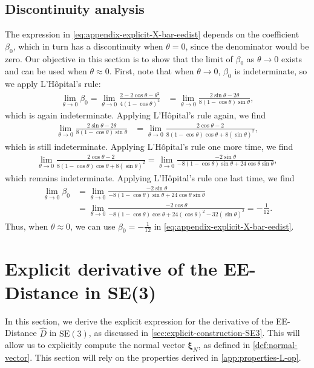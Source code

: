 \subsection{Discontinuity analysis}\label{app:discontinuity-beta-EEdist}
The expression in \eqref{eq:appendix-explicit-X-bar-eedist} depends on the coefficient $\beta_0$, which in turn has a discontinuity when $\theta=0$, since the denominator would be zero. Our objective in this section is to show that the limit of $\beta_0$ as $\theta\to 0$ exists and can be used when $\theta\approx0$. First, note that when $\theta\to 0$, $\beta_0$ is indeterminate, so we apply L'Hôpital's rule:
\begin{align}
    \lim_{\theta\to0}\beta_0=\lim_{\theta\to0} \frac{2-2\cos\theta-\theta^2}{4(1 - \cos\theta)^2}
    &= \lim_{\theta\to0} \frac{2\sin\theta-2\theta}{8(1 - \cos\theta)\sin\theta},
\end{align}
which is again indeterminate. Applying L'Hôpital's rule again, we find
\begin{align}
    \lim_{\theta\to0} \frac{2\sin\theta-2\theta}{8(1 - \cos\theta)\sin\theta}
    &= \lim_{\theta\to0} \frac{2\cos\theta-2}{8(1 - \cos\theta)\cos\theta +8(\sin\theta)^2},
\end{align}
which is still indeterminate. Applying L'Hôpital's rule one more time, we find
\begin{align}
    \lim_{\theta\to0} \frac{2\cos\theta-2}{8(1 - \cos\theta)\cos\theta +8(\sin\theta)^2} =
    \lim_{\theta\to0}\frac{-2\sin\theta}{-8(1 - \cos\theta)\sin\theta +24\cos\theta\sin\theta},
\end{align}
which remains indeterminate. Applying L'Hôpital's rule one last time, we find
\begin{align}
    \lim_{\theta\to0}\beta_0&=\lim_{\theta\to0}\frac{-2\sin\theta}{-8(1 - \cos\theta)\sin\theta +24\cos\theta\sin\theta} \\
    &=
    \lim_{\theta\to0}\frac{-2\cos\theta}{-8(1 - \cos\theta)\cos\theta +24(\cos\theta)^2-32(\sin\theta)^2} = -\frac{1}{12}.
\end{align}
Thus, when $\theta\approx0$, we can use $\beta_0=-\frac{1}{12}$ in \eqref{eq:appendix-explicit-X-bar-eedist}.

\section{Explicit derivative of the EE-Distance in SE(3)}\label{app:explicit-derivative-SE3}
In this section, we derive the explicit expression for the derivative of the EE-Distance $\widehat{D}$ in $\text{SE}(3)$, as discussed in \cref{sec:explicit-construction-SE3}. This will allow us to explicitly compute the normal vector $\boldsymbol{\xi}_N$, as defined in \cref{def:normal-vector}. This section will rely on the properties derived in \cref{app:properties-L-op}.

